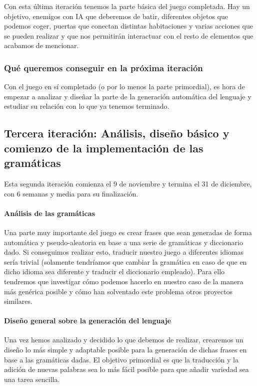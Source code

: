 Con esta última iteración tenemos la parte básica del juego completada. Hay un objetivo, enemigos con IA que deberemos de batir, diferentes objetos que podemos coger, puertas que conectan distintas habitaciones y varias acciones que se pueden realizar y que nos permitirán interactuar con el resto de elementos que acabamos de mencionar.

\subsubsection{Qué queremos conseguir en la próxima iteración}

Con el juego en sí completado (o por lo menos la parte primordial), es hora de empezar a analizar y diseñar la parte de la generación automática del lenguaje y estudiar su relación con lo que ya tenemos terminado.

\subsection{Tercera iteración: Análisis, diseño básico y comienzo de la implementación de las gramáticas}

Esta segunda iteración comienza el 9 de noviembre y termina el 31 de diciembre, con 6 semanas y media para su finalización.

\paragraph{Análisis de las gramáticas} Una parte muy importante del juego es crear frases que sean generadas de forma automática y pseudo-aleatoria en base a una serie de gramáticas y diccionario dado. Si conseguimos realizar esto, traducir nuestro juego a diferentes idiomas sería trivial (solamente tendríamos que cambiar la gramática en caso de que en dicho idioma sea diferente y traducir el diccionario empleado). Para ello tendremos que investigar cómo podemos hacerlo en nuestro caso de la manera más genérica posible y cómo han solventado este problema otros proyectos similares.

\paragraph{Diseño general sobre la generación del lenguaje} Una vez hemos analizado y decidido lo que debemos de realizar, crearemos un diseño lo más simple y adaptable posible para la generación de dichas frases en base a las gramáticas dadas. El objetivo primordial es que la traducción y la adición de nuevas palabras sea lo más fácil posible para que añadir variedad sea una tarea sencilla.

